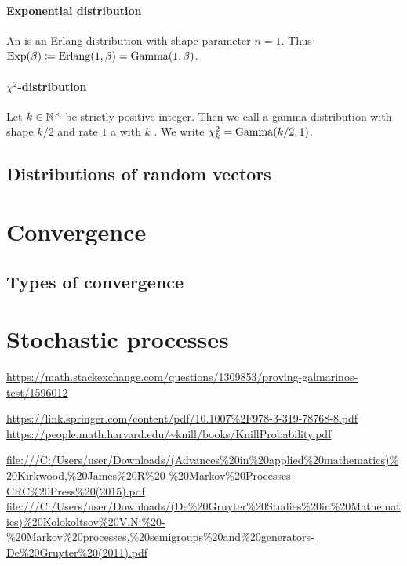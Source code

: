 \subsubsection{Exponential distribution}
\begin{definition}
An  is an Erlang distribution with shape parameter $n = 1$. Thus $\operatorname{Exp}(\beta) \coloneqq \operatorname{Erlang}(1,\beta) = \operatorname{Gamma}(1, \beta)$.
\end{definition}

\subsubsection{$\chi^2$-distribution}
\begin{definition}
Let $k\in \mathbb{N}^\times$ be strictly positive integer. Then we call a gamma distribution with shape $k/2$ and rate $1$ a  with $k$ . We write $\chi^2_k = \operatorname{Gamma}(k/2, 1)$.
\end{definition}

\section{Distributions of random vectors}

\chapter{Convergence}
\section{Types of convergence}

\chapter{Stochastic processes}
\url{https://math.stackexchange.com/questions/1309853/proving-galmarinos-test/1596012}

\url{https://link.springer.com/content/pdf/10.1007%2F978-3-319-78768-8.pdf}
\url{https://people.math.harvard.edu/~knill/books/KnillProbability.pdf}

\url{file:///C:/Users/user/Downloads/(Advances%20in%20applied%20mathematics)%20Kirkwood,%20James%20R%20-%20Markov%20Processes-CRC%20Press%20(2015).pdf}
\url{file:///C:/Users/user/Downloads/(De%20Gruyter%20Studies%20in%20Mathematics)%20Kolokoltsov%20V.N.%20-%20Markov%20processes,%20semigroups%20and%20generators-De%20Gruyter%20(2011).pdf}

